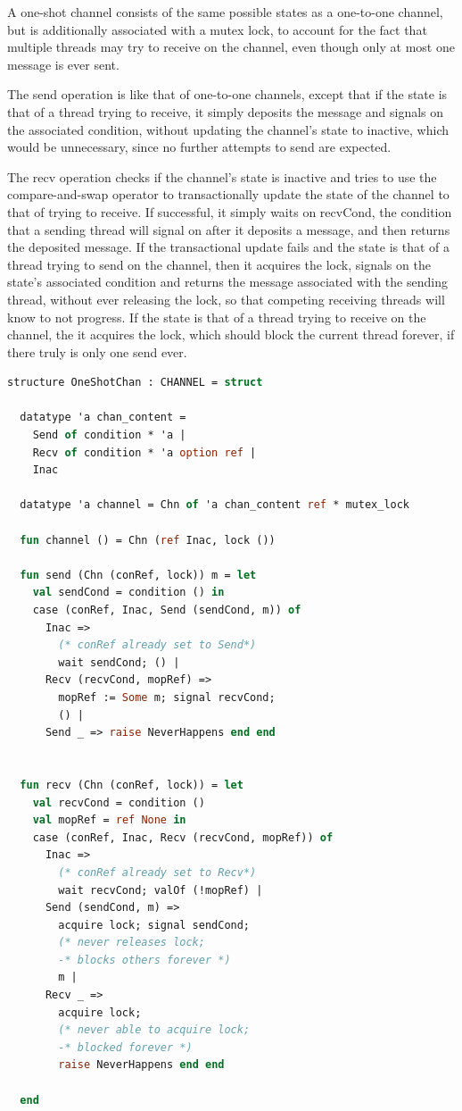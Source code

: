 \documentclass{article}
\begin{document}
A one-shot channel consists of the same possible states as a one-to-one channel, but is
additionally associated with a mutex lock, to account for the fact that multiple threads may
try to receive on the channel, even though only at most one message is ever sent.

The send operation is like that of one-to-one channels, except that if the state is that of a
thread trying to receive, it simply deposits the message and signals on the associated
condition, without updating the channel's state to inactive, which would be unnecessary, since
no further attempts to send are expected.

The recv operation checks if the channel's state is inactive and tries to use the
compare-and-swap operator to transactionally update the state of the channel to that of trying
to receive.  If successful, it simply waits on recvCond, the condition that a sending thread
will signal on after it deposits a message, and then returns the deposited message.  If the
transactional update fails and the state is that of a thread trying to send on the channel,
then it acquires the lock, signals on the state's associated condition and returns the message
associated with the sending thread, without ever releasing the lock, so that competing
receiving threads will know to not progress.  If the state is that of a thread trying to
receive on the channel, the it acquires the lock, which should block the current thread
forever, if there truly is only one send ever.


\begin{lstlisting}[language=ML, escapechar=\%]
  structure OneShotChan : CHANNEL = struct

  datatype 'a chan_content =
    Send of condition * 'a |
    Recv of condition * 'a option ref |
    Inac  

  datatype 'a channel = Chn of 'a chan_content ref * mutex_lock

  fun channel () = Chn (ref Inac, lock ())

  fun send (Chn (conRef, lock)) m = let
    val sendCond = condition () in
    case (conRef, Inac, Send (sendCond, m)) of
      Inac =>
        (* conRef already set to Send*)
        wait sendCond; () |
      Recv (recvCond, mopRef) =>
        mopRef := Some m; signal recvCond;
        () |
      Send _ => raise NeverHappens end end


  fun recv (Chn (conRef, lock)) = let
    val recvCond = condition ()
    val mopRef = ref None in
    case (conRef, Inac, Recv (recvCond, mopRef)) of
      Inac =>
        (* conRef already set to Recv*)
        wait recvCond; valOf (!mopRef) |
      Send (sendCond, m) =>
        acquire lock; signal sendCond;
        (* never releases lock;
        -* blocks others forever *)
        m |
      Recv _ =>
        acquire lock;
        (* never able to acquire lock;
        -* blocked forever *)
        raise NeverHappens end end

  end
  \end{lstlisting}
\end{document}
